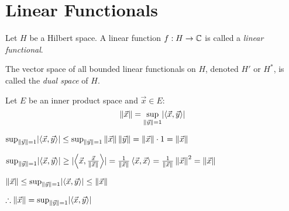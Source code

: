 \documentclass[letterpaper,12pt,fleqn]{article}
\newcommand{\vx}{\vec{x}}
\newcommand{\vy}{\vec{y}}
\newcommand{\norm}[1]{\left\|#1\right\|}
\newcommand{\inner}[1]{\left<#1\right>}
\begin{document}
\section*{Linear Functionals}

\begin{definition}
  Let $H$ be a Hilbert space. A linear function $f:H\to\mathbb{C}$ is called a
  \emph{linear functional}.

  The vector space of all bounded linear functionals on $H$, denoted $H'$ or
  $H^*$, is called the \emph{dual space} of $H$.
\end{definition}

\begin{lemma}
  Let $E$ be an inner product space and $\vx\in E$:
  \[\norm{\vx}=\sup_{\norm{\vy}=1}\abs{\inner{\vx,\vy}}\]
\end{lemma}

\begin{theproof}
  $\sup_{\norm{\vy}=1}\abs{\inner{\vx,\vy}}\le
  \sup_{\norm{\vy}=1}\norm{\vx}\norm{\vy}=\norm{\vx}\cdot1=\norm{\vx}$

  $\sup_{\norm{\vy}=1}\abs{\inner{\vx,\vy}}\ge
  \abs{\inner{\vx,\frac{\vx}{\norm{\vx}}}}=
  \frac{1}{\norm{\vx}}\inner{\vx,\vx}=\frac{1}{\norm{\vx}}\norm{\vx}^2=
  \norm{\vx}$

  $\norm{\vx}\le\sup_{\norm{\vy}=1}\abs{\inner{\vx,\vy}}\le\norm{\vx}$

  $\therefore\norm{\vx}=\sup_{\norm{\vy}=1}\abs{\inner{\vx,\vy}}$
\end{theproof}
\end{document}
